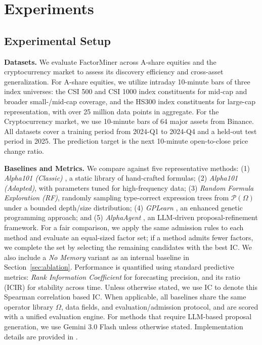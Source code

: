 \documentclass[sigconf]{acmart}
\begin{document}
\section{Experiments}

\subsection{Experimental Setup}

\textbf{Datasets.} 
We evaluate FactorMiner across A-share equities and the cryptocurrency market to assess its discovery efficiency and cross-asset generalization. 
For A-share equities, we utilize intraday 10-minute bars of three index universes: the CSI 500 and CSI 1000 index constituents for mid-cap and broader small-/mid-cap coverage, and the HS300 index constituents for large-cap representation, with over 25 million data points in aggregate. 
For the Cryptocurrency market, we use 10-minute bars of 64 major assets from Binance. 
All datasets cover a training period from 2024-Q1 to 2024-Q4 and a held-out test period in 2025. The prediction target is the next 10-minute open-to-close price change ratio.

\textbf{Baselines and Metrics.} \label{sec:benchmarking}
We compare against five representative methods: (1) \emph{Alpha101 (Classic)} \citep{kakushadze2016alphas}, a static library of hand-crafted formulas; (2) \emph{Alpha101 (Adapted)}, with parameters tuned for high-frequency data; (3) \emph{Random Formula Exploration (RF)}, randomly sampling type-correct expression trees from $\mathcal{P}(\Omega)$ under a bounded depth/size distribution; (4) \emph{GPLearn} \citep{gplearn}, an enhanced genetic programming approach; and (5) \emph{AlphaAgent} \citep{tang2025alphaagent}, an LLM-driven proposal-refinement framework. For a fair comparison, we apply the same admission rules to each method and evaluate an equal-sized factor set; if a method admits fewer factors, we complete the set by selecting the remaining candidates with the best IC. We also include a \emph{No Memory} variant as an internal baseline in Section~\ref{sec:ablation}.
Performance is quantified using standard predictive metrics: \emph{Rank Information Coefficient} for forecasting precision, and its ratio (ICIR) for stability across time. Unless otherwise stated, we use IC to denote this Spearman correlation based IC. When applicable, all baselines share the same operator library $\Omega$, data fields, and evaluation/admission protocol, and are scored with a unified evaluation engine.
For methods that require LLM-based proposal generation, we use Gemini 3.0 Flash unless otherwise stated.
Implementation details are provided in .
\end{document}
